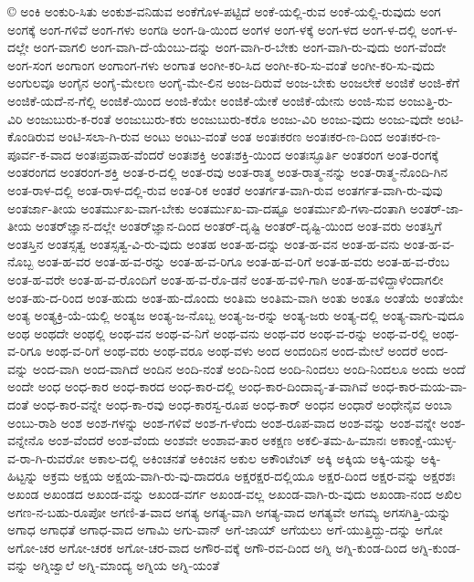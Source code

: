 ©
ಅಂಕಿ
ಅಂಕುರಿ-ಸಿತು
ಅಂಕುಶ-ವನಿಡುವ
ಅಂಕೆಗೊಳ-ಪಟ್ಟಿದೆ
ಅಂಕೆ-ಯಲ್ಲಿ-ರುವ
ಅಂಕೆ-ಯಲ್ಲಿ-ರುವುದು
ಅಂಗ
ಅಂಗಕ್ಕೆ
ಅಂಗ-ಗಳಿವೆ
ಅಂಗ-ಗಳು
ಅಂಗಡಿ
ಅಂಗ-ಡಿ-ಯಿಂದ
ಅಂಗಳ
ಅಂಗ-ಳಕ್ಕೆ
ಅಂಗ-ಳದ
ಅಂಗ-ಳ-ದಲ್ಲಿ
ಅಂಗ-ಳ-ದಲ್ಲೇ
ಅಂಗ-ವಾಗಲಿ
ಅಂಗ-ವಾಗಿ-ದೆ-ಯೆಂಬು-ದನ್ನು
ಅಂಗ-ವಾಗಿ-ರ-ಬೇಕು
ಅಂಗ-ವಾಗಿ-ರು-ವುದು
ಅಂಗ-ವೆಂದೇ
ಅಂಗ-ಸಂಗ
ಅಂಗಾಂಗ
ಅಂಗಾಂಗ-ಗಳು
ಅಂಗಾತ
ಅಂಗೀ-ಕರಿ-ಸಿದ
ಅಂಗೀ-ಕರಿ-ಸು-ವಂತೆ
ಅಂಗೀ-ಕರಿ-ಸು-ವುದು
ಅಂಗುಲವೂ
ಅಂಗೈನ
ಅಂಗೈ-ಮೇಲಣ
ಅಂಗೈ-ಮೇ-ಲಿನ
ಅಂಜ-ದಿರುವೆ
ಅಂಜ-ಬೇಕು
ಅಂಜಲೇಕೆ
ಅಂಜಿಕೆ
ಅಂಜಿ-ಕೆಗೆ
ಅಂಜಿಕೆ-ಯದೆ-ನ-ಗೆಲ್ಲಿ
ಅಂಜಿಕೆ-ಯಿಂದ
ಅಂಜಿ-ಕೆಯೇ
ಅಂಜಿಕೆ-ಯೇಕೆ
ಅಂಜಿಕೆ-ಯೇನು
ಅಂಜಿ-ಸುವ
ಅಂಜುತ್ತಿ-ರು-ವಿರಿ
ಅಂಜುಬುರು-ಕ-ರಂತೆ
ಅಂಜುಬುರು-ಕರು
ಅಂಜುಬುರು-ಕರೊ
ಅಂಜು-ವಿರಿ
ಅಂಜು-ವುದು
ಅಂಜು-ವುದೇ
ಅಂಟಿ-ಕೊಂಡಿರುವ
ಅಂಟಿ-ಸಲಾ-ಗಿ-ರುವ
ಅಂಟು
ಅಂಟು-ವಂತೆ
ಅಂತ
ಅಂತಃಕರಣ
ಅಂತಃಕರ-ಣ-ದಿಂದ
ಅಂತಃಕರ-ಣ-ಪೂರ್ವ-ಕ-ವಾದ
ಅಂತಃಪ್ರವಾಹ-ವೆಂದರೆ
ಅಂತಃಶಕ್ತಿ
ಅಂತಃಶಕ್ತಿ-ಯಿಂದ
ಅಂತಃಸ್ಫೂರ್ತಿ
ಅಂತರಂಗ
ಅಂತ-ರಂಗಕ್ಕೆ
ಅಂತರಂಗದ
ಅಂತರಂಗ-ಶಕ್ತಿ
ಅಂತ-ರ-ದಲ್ಲಿ
ಅಂತ-ರವು
ಅಂತ-ರಾತ್ಮ
ಅಂತ-ರಾತ್ಮ-ನನ್ನು
ಅಂತ-ರಾತ್ಮ-ನೊಂದಿ-ಗಿನ
ಅಂತ-ರಾಳ-ದಲ್ಲಿ
ಅಂತ-ರಾಳ-ದಲ್ಲಿ-ರುವ
ಅಂತ-ರಿಕ
ಅಂತರೆ
ಅಂತರ್ಗತ-ವಾಗಿ-ರುವ
ಅಂತರ್ಗತ-ವಾಗಿ-ರು-ವುವು
ಅಂತರ್ಜಾ-ತೀಯ
ಅಂತರ್ಮುಖ-ವಾಗ-ಬೇಕು
ಅಂತರ್ಮುಖ-ವಾ-ದಷ್ಟೂ
ಅಂತರ್ಮುಖಿ-ಗಳಾ-ದಂತಾಗಿ
ಅಂತರ್‌-ಜಾ-ತೀಯ
ಅಂತರ್‌ಜ್ಞಾನ-ದಲ್ಲೇ
ಅಂತರ್‌ಜ್ಞಾನ-ದಿಂದ
ಅಂತರ್‌-ದೃಷ್ಟಿ
ಅಂತರ್‌-ದೃಷ್ಟಿ-ಯಿಂದ
ಅಂತ-ವರು
ಅಂತಸ್ತಿಗೆ
ಅಂತಸ್ತಿನ
ಅಂತಸ್ಸತ್ವ
ಅಂತಸ್ಸತ್ವ-ವಿ-ರು-ವುದು
ಅಂತಹ
ಅಂತ-ಹ-ದನ್ನು
ಅಂತ-ಹ-ವನ
ಅಂತ-ಹ-ವನು
ಅಂತ-ಹ-ವ-ನೊಬ್ಬ
ಅಂತ-ಹ-ವರ
ಅಂತ-ಹ-ವ-ರನ್ನು
ಅಂತ-ಹ-ವ-ರಿಗೂ
ಅಂತ-ಹ-ವ-ರಿಗೆ
ಅಂತ-ಹ-ವರು
ಅಂತ-ಹ-ವ-ರೆಂಬ
ಅಂತ-ಹ-ವರೇ
ಅಂತ-ಹ-ವ-ರೊಂದಿಗೆ
ಅಂತ-ಹ-ವ-ರೊ-ಡನೆ
ಅಂತ-ಹ-ವಳಿ-ಗಾಗಿ
ಅಂತ-ಹ-ವಳಿದ್ದಾಳೆಂದಾಗಲೀ
ಅಂತ-ಹು-ದ-ರಿಂದ
ಅಂತ-ಹುದು
ಅಂತ-ಹು-ದೊಂದು
ಅಂತಿಮ
ಅಂತಿಮ-ವಾಗಿ
ಅಂತು
ಅಂತೂ
ಅಂತೆಯೆ
ಅಂತೆಯೇ
ಅಂತ್ಯ
ಅಂತ್ಯಕ್ರಿ-ಯೆ-ಯಲ್ಲಿ
ಅಂತ್ಯಜ
ಅಂತ್ಯ-ಜ-ನೊಬ್ಬ
ಅಂತ್ಯ-ಜ-ರನ್ನು
ಅಂತ್ಯ-ಜರು
ಅಂತ್ಯ-ದಲ್ಲಿ
ಅಂತ್ಯ-ವಾಗು-ವುದೂ
ಅಂಥ
ಅಂಥದೇ
ಅಂಥಲ್ಲಿ
ಅಂಥ-ವನ
ಅಂಥ-ವ-ನಿಗೆ
ಅಂಥ-ವನು
ಅಂಥ-ವರ
ಅಂಥ-ವ-ರನ್ನು
ಅಂಥ-ವ-ರಲ್ಲಿ
ಅಂಥ-ವ-ರಿಗೂ
ಅಂಥ-ವ-ರಿಗೆ
ಅಂಥ-ವರು
ಅಂಥ-ವರೂ
ಅಂಥ-ವಳು
ಅಂದ
ಅಂದಂದಿನ
ಅಂದ-ಮೇಲೆ
ಅಂದರೆ
ಅಂದ-ವನ್ನು
ಅಂದ-ವಾಗಿ
ಅಂದ-ವಾಗಿದೆ
ಅಂದಿನ
ಅಂದಿ-ನಂತೆ
ಅಂದಿ-ನಿಂದ
ಅಂದಿ-ನಿಂದಲು
ಅಂದಿ-ನಿಂದಲೂ
ಅಂದು
ಅಂದೆ
ಅಂದೇ
ಅಂಧ
ಅಂಧ-ಕಾರ
ಅಂಧ-ಕಾರದ
ಅಂಧ-ಕಾರ-ದಲ್ಲಿ
ಅಂಧ-ಕಾರ-ದಿಂದಾವೃ-ತ-ವಾಗಿವೆ
ಅಂಧ-ಕಾರ-ಮಯ-ವಾ-ದಂತೆ
ಅಂಧ-ಕಾರ-ವನ್ನೇ
ಅಂಧ-ಕಾ-ರವು
ಅಂಧ-ಕಾರಸ್ವ-ರೂಪ
ಅಂಧ-ಕಾರ್
ಅಂಧನ
ಅಂಧಾರೆ
ಅಂಧೇನೈವ
ಅಂಬಾ
ಅಂಬು-ರಾಶಿ
ಅಂಶ
ಅಂಶ-ಗಳನ್ನು
ಅಂಶ-ಗಳಿವೆ
ಅಂಶ-ಗ-ಳೆಂದು
ಅಂಶ-ರೂಪ-ವಾದ
ಅಂಶ-ವನ್ನು
ಅಂಶ-ವನ್ನೇ
ಅಂಶ-ವನ್ನೇನೊ
ಅಂಶ-ವೆಂದರೆ
ಅಂಶ-ವೆಂದು
ಅಂಶವೇ
ಅಂಶಾವ-ತಾರ
ಅಕಕ್ಷಣ
ಅಕಲಿ-ತಮ-ಹಿ-ಮಾನಃ
ಅಕಾಂಕ್ಷೆ-ಯುಳ್ಳ-ವ-ರಾ-ಗಿ-ರುವರೋ
ಅಕಾಲ-ದಲ್ಲಿ
ಅಕಿಂಚನತೆ
ಅಕಿಂಚಿನ
ಅಕುಲ
ಅಕೌಂಟೆಂಟ್
ಅಕ್ಕಿ
ಅಕ್ಕಿಯ
ಅಕ್ಕಿ-ಯನ್ನು
ಅಕ್ಕಿ-ಹಿಟ್ಟನ್ನು
ಅಕ್ರಮ
ಅಕ್ಷಯ
ಅಕ್ಷಯ-ವಾಗಿ-ರು-ವು-ದಾದರೂ
ಅಕ್ಷರಕ್ಷರ-ದಲ್ಲಿಯೂ
ಅಕ್ಷರ-ದಿಂದ
ಅಕ್ಷರ-ವನ್ನು
ಅಕ್ಷರಶಃ
ಅಖಂಡ
ಅಖಂಡದ
ಅಖಂಡ-ವನ್ನು
ಅಖಂಡ-ವರ್ಗ
ಅಖಂಡ-ವಲ್ಲ
ಅಖಂಡ-ವಾಗಿ-ರು-ವುದು
ಅಖಂಡಾ-ನಂದ
ಅಖಿಲ
ಅಗಣ-ನ-ಬಹು-ರೂಪೋ
ಅಗಣಿ-ತ-ವಾದ
ಅಗತ್ಯ
ಅಗತ್ಯ-ವಾಗಿ
ಅಗತ್ಯ-ವಾದ
ಅಗತ್ಯವೇ
ಅಗಮ್ಯ
ಅಗಸಗಿತ್ತಿ-ಯನ್ನು
ಅಗಾಧ
ಅಗಾಧತೆ
ಅಗಾಧ-ವಾದ
ಅಗಾಮಿ
ಅಗು-ವಾನ್
ಅಗೆ-ಜಾಯ್
ಅಗೆಯಲು
ಅಗೆ-ಯುತ್ತಿದ್ದು-ದನ್ನು
ಅಗೋ
ಅಗೋ-ಚರ
ಅಗೋ-ಚರಕ
ಅಗೋ-ಚರ-ವಾದ
ಅಗೌರ-ವಕ್ಕೆ
ಅಗೌ-ರವ-ದಿಂದ
ಅಗ್ನಿ
ಅಗ್ನಿ-ಕುಂಡ-ದಿಂದ
ಅಗ್ನಿ-ಕುಂಡ-ವನ್ನು
ಅಗ್ನಿಜ್ವಾಲೆ
ಅಗ್ನಿ-ಮಾಂದ್ಯ
ಅಗ್ನಿಯ
ಅಗ್ನಿ-ಯಂತೆ
